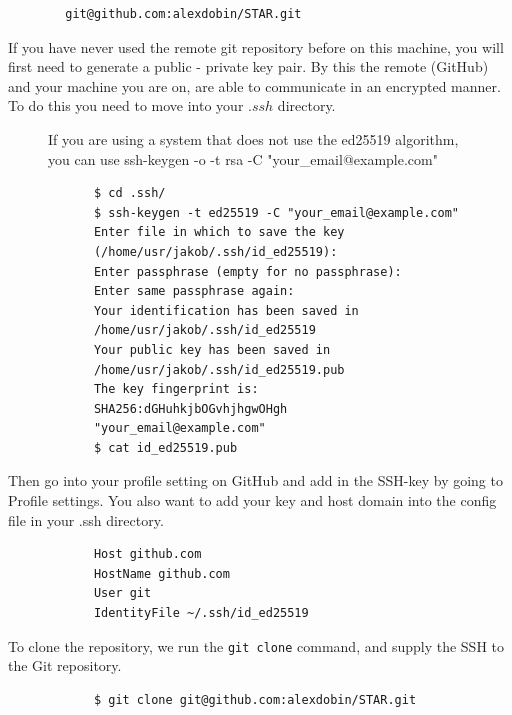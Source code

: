 \documentclass[../main/git_course_main.tex]{subfiles}
\begin{document}
	\begin{verbatim}
		git@github.com:alexdobin/STAR.git
	\end{verbatim}
	
	If you have never used the remote git repository before on this machine, you will first need to generate a public - private key pair. By this the remote (GitHub) and your machine you are on, are able to communicate in an encrypted manner. To do this you need to move into your $.ssh$ directory.
	
	\begin{figure}[h!]
		\begin{redbox}
			If you are using a system that does not use the ed25519 algorithm, you can use
			ssh-keygen -o -t rsa -C "your\_email@example.com"
		\end{redbox}
	\end{figure}
	
	\begin{codebox}
		\begin{lstlisting}
			$ cd .ssh/
			$ ssh-keygen -t ed25519 -C "your_email@example.com"
			Enter file in which to save the key 
			(/home/usr/jakob/.ssh/id_ed25519): 
			Enter passphrase (empty for no passphrase): 
			Enter same passphrase again: 
			Your identification has been saved in 
			/home/usr/jakob/.ssh/id_ed25519
			Your public key has been saved in 
			/home/usr/jakob/.ssh/id_ed25519.pub
			The key fingerprint is:
			SHA256:dGHuhkjbOGvhjhgwOHgh
			"your_email@example.com"
			$ cat id_ed25519.pub
		\end{lstlisting}
	\end{codebox}
	
	Then go into your profile setting on GitHub and add in the SSH-key by going to Profile settings. You also want to add your key and host domain into the config file in your .ssh directory.
	
	\begin{codebox}
		\begin{lstlisting}
			Host github.com
			HostName github.com
			User git
			IdentityFile ~/.ssh/id_ed25519
		\end{lstlisting}
	\end{codebox}
	
	To clone the repository, we run the \verb$git clone$ command, and supply the SSH to the Git repository.
	
	\begin{codebox}
		\begin{lstlisting}
			$ git clone git@github.com:alexdobin/STAR.git
		\end{lstlisting}
	\end{codebox}
	
\end{document}
